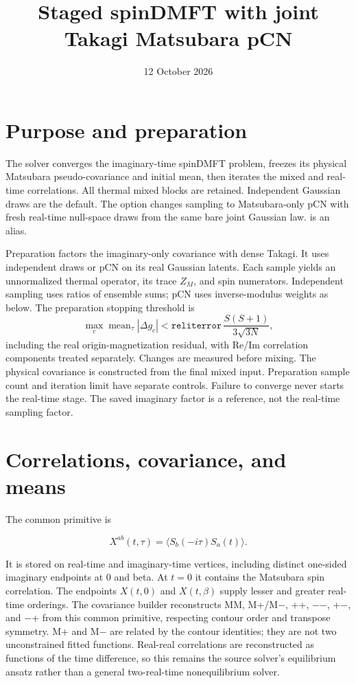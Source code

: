 \documentclass[11pt,a4paper]{article}
\newcommand{\code}[1]{\path{#1}}
\begin{document}
\title{Staged spinDMFT with joint Takagi Matsubara pCN}
\date{12 October 2026}
\maketitle
\tableofcontents

\section{Purpose and preparation}
The solver converges the imaginary-time spinDMFT problem, freezes its physical
Matsubara pseudo-covariance and initial mean, then iterates the mixed and real-time
correlations. All thermal mixed blocks are retained. Independent Gaussian draws
are the default. The option \code{--jointMatsubaraPCN} changes sampling to
Matsubara-only pCN with fresh real-time null-space draws from the same bare
joint Gaussian law. \code{--samplingStrategy=pcn} is an alias.

Preparation factors the imaginary-only covariance with dense Takagi. It uses
independent draws or pCN on its real Gaussian latents. Each sample yields an
unnormalized thermal operator, its trace \(Z_M\), and spin numerators. Independent
sampling uses ratios of ensemble sums; pCN uses inverse-modulus weights as below.
The preparation stopping threshold is
\[
 \max_c\operatorname{mean}_{\tau}|\Delta g_c|
 < \texttt{reliterror}\,\frac{S(S+1)}{3\sqrt{3N}},
\]
including the real origin-magnetization residual, with Re/Im correlation
components treated separately. Changes are measured before mixing. The physical
covariance is constructed from the final mixed input. Preparation sample count
and iteration limit have separate controls. Failure to converge never starts the
real-time stage. The saved imaginary factor is a reference, not the real-time
sampling factor.

\section{Correlations, covariance, and means}

The common primitive is

\[
X^{ab}(t,\tau)=\langle S_b(-i\tau)S_a(t)\rangle.
\]

It is stored on real-time and imaginary-time vertices, including distinct one-sided imaginary endpoints at 0 and beta. At \(t=0\) it contains the Matsubara spin correlation. The endpoints \(X(t,0)\) and \(X(t,\beta)\) supply lesser and greater real-time orderings. The covariance builder reconstructs MM, M+/M\ensuremath{-}, ++, \ensuremath{-}\ensuremath{-}, +\ensuremath{-}, and \ensuremath{-}+ from this common primitive, respecting contour order and transpose symmetry. M+ and M\ensuremath{-} are related by the contour identities; they are not two unconstrained fitted functions. Real-real correlations are reconstructed as functions of the time difference, so this remains the source solver's equilibrium ansatz rather than a general two-real-time nonequilibrium solver.
\end{document}
